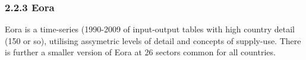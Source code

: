 \subsubsection{2.2.3 Eora}


Eora is a time-series (1990-2009 of input-output tables with high country detail (150 or so), utilising assymetric levels of detail and concepts of supply-use. There is further a smaller version of Eora at 26 sectors common for all countries.